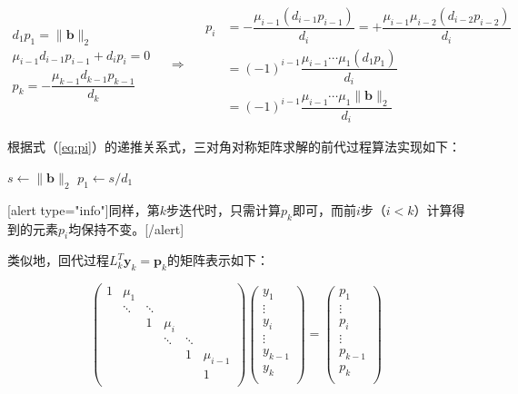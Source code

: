 \documentclass[UTF8,nofonts]{ctexart}
\begin{document}
\begin{equation}
	\label{eq:pi}
	\begin{array}{c}
		d_1p_1 = \|\boldsymbol{b}\|_2 \\
		\mu_{i-1}d_{i-1}p_{i-1}+d_ip_i = 0 \\
		p_k=-\dfrac{\mu_{k-1}d_{k-1}p_{k-1}}{d_k}
	\end{array} \quad\Longrightarrow\quad
	\begin{aligned}
		p_i &= -\dfrac{\mu_{i-1}(d_{i-1}p_{i-1})}{d_i}
		= +\dfrac{\mu_{i-1}\mu_{i-2}(d_{i-2}p_{i-2})}{d_i} \\
		&= (-1)^{i-1}\dfrac{\mu_{i-1}\cdots\mu_{1}(d_1p_1)}{d_i} \\
		&= (-1)^{i-1}\dfrac{\mu_{i-1}\cdots\mu_{1}\|\boldsymbol{b}\|_2}{d_i}
	\end{aligned}
\end{equation}

根据式（\ref{eq:pi}）的递推关系式，三对角对称矩阵求解的前代过程算法实现如下：

\begin{algorithm}[H]
	$s \gets \|\boldsymbol{b}\|_2$\;
	$p_1 \gets s/d_1$\;
\end{algorithm}

[alert type="info"]同样，第$k$步迭代时，只需计算$p_k$即可，而前$i$步（$i<k$）计算得到的元素$p_i$均保持不变。[/alert]

类似地，回代过程$L_k^T\boldsymbol{y}_k=\boldsymbol{p}_k$的矩阵表示如下：

\begin{equation}
	\label{eq:bwd}
	\begin{pmatrix}
		1 & \mu_1 & & & & \\
		& \ddots & \ddots & & & \\
		& & 1 & \mu_i & & \\
		& & & \ddots & \ddots & \\
		& & & & 1 & \mu_{i-1} \\
		& & & & & 1 \\
	\end{pmatrix}
	\begin{pmatrix}
		y_1 \\ \vdots \\ y_i \\ \vdots \\ y_{k-1} \\ y_k \\
	\end{pmatrix}=
	\begin{pmatrix}
		p_1 \\ \vdots \\ p_i \\ \vdots \\ p_{k-1} \\ p_k \\
	\end{pmatrix}
\end{equation}
\end{document}
